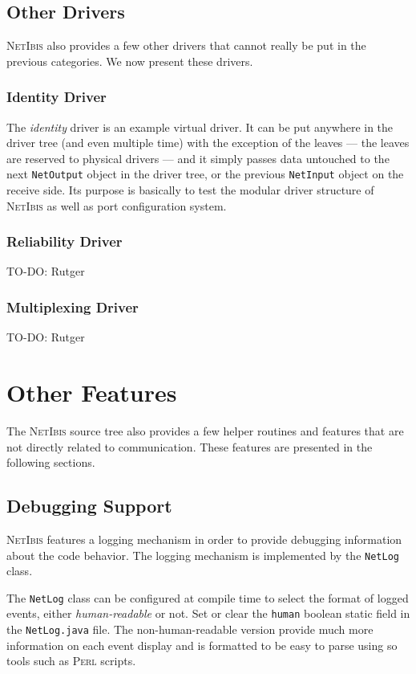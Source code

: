 \documentclass[11pt]{book}
\def\NetIbis{\textsc{NetIbis}\xspace}
\begin{document}
\subsection{Other Drivers}
\label{sec:other-drivers}
\NetIbis also provides a few other drivers that cannot really be put
in the previous categories. We now present these drivers.

%
\subsubsection{Identity Driver}
\label{sec:identity-driver}
The \emph{identity} driver is an example virtual driver. It can be put
anywhere in the driver tree (and even multiple time) with the
exception of the leaves --- the leaves are reserved to physical
drivers --- and it simply passes data untouched to the next
\texttt{NetOutput} object in the driver tree, or the previous
\texttt{NetInput} object on the receive side. Its purpose is basically
to test the modular driver structure of \NetIbis as well as port
configuration system.

%
\subsubsection{Reliability Driver}
\label{sec:reliability-driver}
TO-DO: Rutger

%
\subsubsection{Multiplexing Driver}
\label{sec:multiplexing-driver}
TO-DO: Rutger


\section{Other Features}
\label{sec:other-features}
The \NetIbis source tree also provides a few helper routines and
features that are not directly related to communication. These
features are presented in the following sections.

\subsection{Debugging Support}
\label{sec:debugging-support}
\NetIbis features a logging mechanism in order to provide debugging
information about the code behavior. The logging mechanism is
implemented by the \texttt{NetLog} class. 

The \texttt{NetLog} class can be configured at compile time to select
the format of logged events, either \emph{human-readable} or not. Set
or clear the \texttt{human} boolean static field in the
\texttt{NetLog.java} file. The non-human-readable version provide much
more information on each event display and is formatted to be easy to
parse using so tools such as \textsc{Perl} scripts. 
\end{document}
